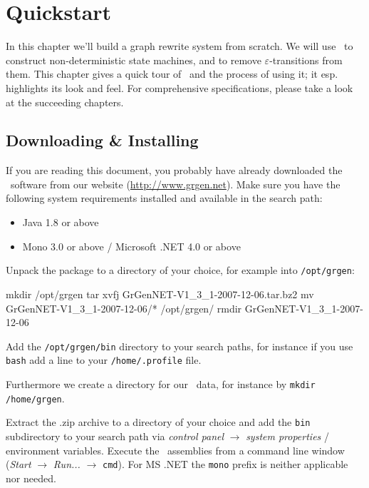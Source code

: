 \chapter{Quickstart}

In this chapter we'll build a graph rewrite system from scratch.
We will use \GrG\ to construct non-deterministic state machines, and to remove $\varepsilon$-transitions from them.
This chapter gives a quick tour of \GrG\ and the process of using it; it esp. highlights its look and feel.
For comprehensive specifications, please take a look at the succeeding chapters.


\section{Downloading \& Installing}

If you are reading this document, you probably have already downloaded the \GrG\ software from our website (\url{http://www.grgen.net}). Make sure you have the following system requirements installed and available in the search path:
\begin{itemize}
	\item Java 1.8 or above
	\item Mono 3.0 or above / Microsoft .NET 4.0 or above
\end{itemize}

Unpack the package to a directory of your choice, for example into \texttt{/opt/grgen}:
\begin{bash}
mkdir /opt/grgen
tar xvfj GrGenNET-V1_3_1-2007-12-06.tar.bz2
mv GrGenNET-V1_3_1-2007-12-06/* /opt/grgen/
rmdir GrGenNET-V1_3_1-2007-12-06
\end{bash}
Add the \texttt{/opt/grgen/bin} directory to your search paths, for instance if you use \texttt{bash} add a line to your \texttt{/home/.profile} file.
Furthermore we create a directory for our \GrG\ data, for instance by \texttt{mkdir /home/grgen}.

\vspace{2mm}
Extract the .zip archive to a directory of your choice and add the \texttt{bin} subdirectory to your search path via \emph{control panel} $\rightarrow$ \emph{system properties} / environment variables.
Execute the \GrG\ assemblies from a command line window (\emph{Start} $\rightarrow$ \emph{Run...} $\rightarrow$ \texttt{cmd}).
For MS .NET the \texttt{mono} prefix is neither applicable nor needed.

